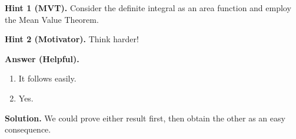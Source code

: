 \documentclass[10pt,]{article}
\theoremstyle{plain}
\theoremstyle{definition}
\theoremstyle{definition}
\theoremstyle{definition}
\theoremstyle{definition}
\theoremstyle{definition}
\theoremstyle{definition}
\numberwithin{equation}{section}
\begin{document}
\begin{exerciselist}
\par\smallskip%
\noindent\textbf{Hint 1 (MVT).}\hypertarget{hint-6}{}\quad%
\hypertarget{p-513}{}%
Consider the definite integral as an area function and employ the Mean Value Theorem.%
\par\smallskip%
\noindent\textbf{Hint 2 (Motivator).}\hypertarget{exercise-complicated-second-hint}{}\quad%
\hypertarget{p-514}{}%
Think harder!%
\par\smallskip%
\noindent\textbf{Answer (Helpful).}\hypertarget{exercise-complicated-first-answer}{}\quad%
\hypertarget{p-515}{}%
\leavevmode%
\begin{enumerate}[label=(\alph*)]
\item\hypertarget{li-162}{}\hypertarget{p-516}{}%
It follows easily.%
\item\hypertarget{li-163}{}\hypertarget{p-517}{}%
Yes.%
\end{enumerate}
%
\par\smallskip%
\noindent\textbf{Solution.}\hypertarget{solution-12}{}\quad%
\hypertarget{p-518}{}%
We could prove either result first, then obtain the other as an easy consequence.%
\end{exerciselist}
\typeout{************************************************}
\typeout{************************************************}
\end{document}
